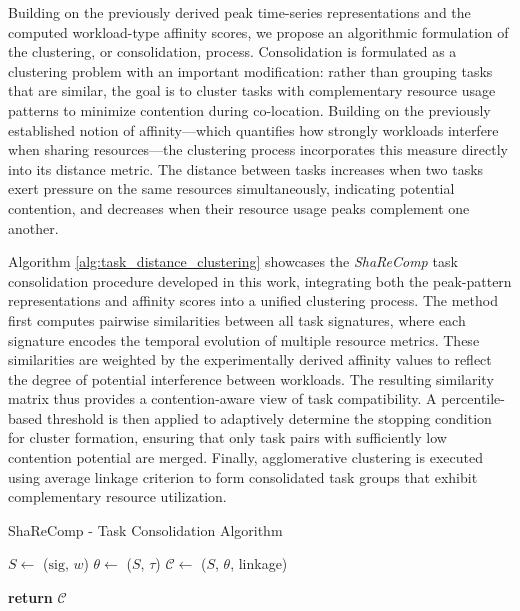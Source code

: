 \label{sec:algorithmic_approach_consolidation}

Building on the previously derived peak time-series representations and the computed workload-type affinity scores, we propose an algorithmic formulation of the clustering, or consolidation, process.
Consolidation is formulated as a clustering problem with an important modification: rather than grouping tasks that are similar, the goal is to cluster tasks with complementary resource usage patterns to minimize contention during co-location. Building on the previously established notion of affinity—which quantifies how strongly workloads interfere when sharing resources—the clustering process incorporates this measure directly into its distance metric. The distance between tasks increases when two tasks exert pressure on the same resources simultaneously, indicating potential contention, and decreases when their resource usage peaks complement one another.

Algorithm \ref{alg:task_distance_clustering} showcases the \textit{ShaReComp} task consolidation procedure developed in this work, integrating both the peak-pattern representations and affinity scores into a unified clustering process. The method first computes pairwise similarities between all task signatures, where each signature encodes the temporal evolution of multiple resource metrics. These similarities are weighted by the experimentally derived affinity values to reflect the degree of potential interference between workloads. The resulting similarity matrix thus provides a contention-aware view of task compatibility.
A percentile-based threshold is then applied to adaptively determine the stopping condition for cluster formation, ensuring that only task pairs with sufficiently low contention potential are merged. Finally, agglomerative clustering is executed using average linkage criterion to form consolidated task groups that exhibit complementary resource utilization.

\begin{algorithm}[H]
    \caption{ShaReComp - Task Consolidation Algorithm}
    \label{alg:task_distance_clustering}


    $S \gets$ \Sim($\mathrm{sig}$, $w$) 
    $\theta \gets$ \Thresh($S$, $\tau$) 
    $\mathcal{C} \gets$ \Merge($S$, $\theta$, linkage) 

    \textbf{return } $\mathcal{C}$
\end{algorithm}

